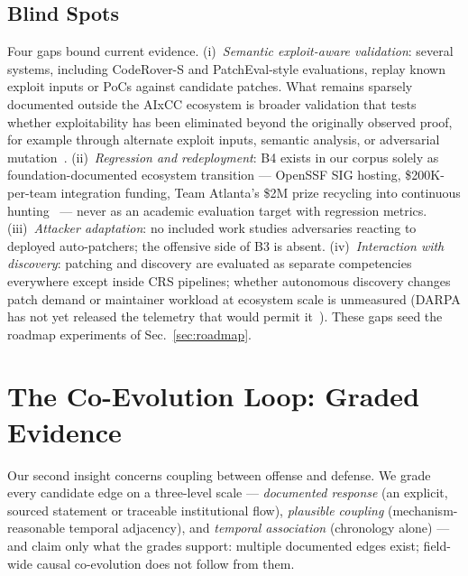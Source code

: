 \documentclass[conference,compsoc]{IEEEtran}
\begin{document}
\subsection{Blind Spots}
Four gaps bound current evidence. (i)~\emph{Semantic exploit-aware validation}: several
systems, including CodeRover-S and PatchEval-style evaluations, replay known exploit inputs
or PoCs against candidate patches. What remains sparsely documented outside the AIxCC
ecosystem is broader validation that tests whether exploitability has been eliminated beyond
the originally observed proof, for example through alternate exploit inputs, semantic analysis,
or adversarial mutation~\cite{ossfuzz-aifixing-2024,patcheval2025}.
(ii)~\emph{Regression and redeployment}: B4 exists in our corpus solely as foundation-documented
ecosystem transition --- OpenSSF SIG hosting, \$200K-per-team integration funding, Team Atlanta's
\$2M prize recycling into continuous hunting~\cite{openssfaixcc2026,tobbuttercup2025,taafc2025}
--- never as an academic evaluation target with regression metrics. (iii)~\emph{Attacker
adaptation}: no included work studies adversaries reacting to deployed auto-patchers; the
offensive side of B3 is absent. (iv)~\emph{Interaction with discovery}: patching and discovery
are evaluated as separate competencies everywhere except inside CRS pipelines; whether autonomous
discovery changes patch demand or maintainer workload at ecosystem scale is unmeasured (DARPA has
not yet released the telemetry that would permit it~\cite{tobbuttercup2025}). These gaps seed
the roadmap experiments of Sec.~\ref{sec:roadmap}.

\section{The Co-Evolution Loop: Graded Evidence}
\label{sec:coevolution}

Our second insight concerns coupling between offense and defense. We grade every candidate edge
on a three-level scale --- \emph{documented response} (an explicit, sourced statement or
traceable institutional flow), \emph{plausible coupling} (mechanism-reasonable temporal
adjacency), and \emph{temporal association} (chronology alone) --- and claim only what the
grades support: multiple documented edges exist; field-wide causal co-evolution does not follow
from them.
\end{document}
